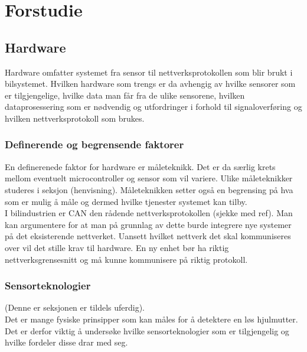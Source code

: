 \chapter{Forstudie}

\section{Hardware}

Hardware omfatter systemet fra sensor til nettverksprotokollen som blir brukt i
bilsystemet. Hvilken hardware
som trengs er da avhengig av hvilke sensorer som er tilgjengelige, hvilke data
man får fra de ulike sensorene, hvilken dataprosessering som er nødvendig og
utfordringer i forhold til signaloverføring og
hvilken nettverksprotokoll som brukes. \\

\subsection{Definerende og begrensende faktorer}

En definerenede faktor for hardware er måleteknikk. Det er da særlig krets
mellom eventuelt microcontroller og sensor som vil variere. Ulike måleteknikker studeres
i seksjon (henvisning). Måleteknikken setter også en begrensing på hva som er
mulig å måle og dermed hvilke tjenester systemet kan tilby. \\

I bilindustrien er CAN den rådende nettverksprotokollen (sjekke med ref). Man
kan argumentere for at man på grunnlag av dette burde integrere nye systemer på
det eksisterende nettverket. Uansett hvilket nettverk det skal kommuniseres over
vil det stille krav til hardware. En ny enhet bør ha riktig nettverksgrensesnitt
og må kunne kommunisere på riktig protokoll. \\

\subsection{Sensorteknologier}


(Denne er seksjonen er tildels uferdig). \\

Det er mange fysiske prinsipper som kan måles for å detektere en løs hjulmutter.
Det er derfor viktig å undersøke hvilke sensorteknologier som er tilgjengelig og
hvilke fordeler disse drar med seg. \\

